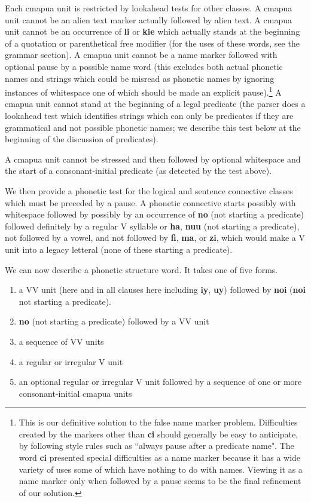 \documentclass[12pt]{book}
\begin{document}
Each cmapua unit is restricted by lookahead tests for other classes.  A cmapua unit cannot be an alien text marker actually followed by alien text.  A cmapua unit cannot be an occurrence of {\bf li} or {\bf kie} which actually stands at the beginning of a quotation or parenthetical free modifier (for the uses of these words, see the grammar section).  A cmapua unit cannot be a name marker followed with optional pause by a possible name word (this excludes both
actual phonetic names and strings which could be misread as phonetic names by ignoring instances of whitespace one of which should be made an explicit pause).\footnote{This is our definitive solution to the false name marker problem.  Difficulties created by the markers other than {\bf ci} should generally be easy to anticipate, by following style rules such as ``always pause after a predicate name".  The word {\bf ci} presented special difficulties as a name marker because it has a wide variety of uses some of which have nothing to do with names.  Viewing it as a name marker only when followed by a pause seems to be the final refinement of our solution.}   A cmapua unit
cannot stand at the beginning of a legal predicate (the parser  does a lookahead test which identifies strings which can only be predicates if they are grammatical and not possible phonetic names;  we describe this test below at the beginning of the discussion of predicates).  

A cmapua unit cannot be stressed and then followed by optional whitespace and the start of a consonant-initial predicate (as detected by the test above).

We then provide a phonetic test for the logical and sentence connective classes which must be preceded by a pause.  A phonetic connective starts possibly with whitespace followed by possibly by an occurrence of 
{\bf no} (not starting a predicate) followed definitely by a regular V syllable or {\bf ha}, {\bf nuu} (not starting a predicate), not followed by a vowel, and not followed by {\bf fi}, {\bf ma}, or {\bf zi}, which would make a V unit into a legacy letteral (none of these starting a predicate).

We can now describe a phonetic structure word.  It takes one of five forms.

\begin{enumerate}

\item a VV unit (here and in all clauses here including {\bf iy}, {\bf uy}) followed by {\bf noi} ({\bf noi} not starting a predicate).

\item {\bf no} (not starting a predicate) followed by a VV unit

\item a sequence of VV units

\item a regular or irregular V unit

\item an optional regular or irregular V unit followed by a sequence of one or more consonant-initial cmapua units

\end{enumerate}
\end{document}
